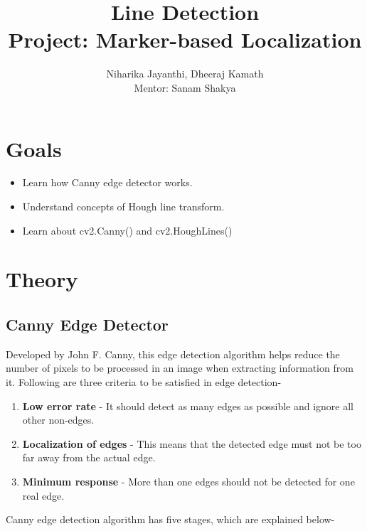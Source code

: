 \documentclass[]{article}
\date{}
\providecommand{\tightlist}{%
  \setlength{\itemsep}{0pt}\setlength{\parskip}{0pt}}
\begin{document}
	\title{\huge\textbf{Line Detection}\LARGE \\Project: Marker-based Localization}
	\author{Niharika Jayanthi, Dheeraj Kamath \\Mentor: Sanam Shakya}
	\maketitle
	\pagebreak
\section{Goals}\label{goals}

\begin{itemize}
\tightlist
\item
  Learn how Canny edge detector works.
\item
  Understand concepts of Hough line transform.
\item
  Learn about cv2.Canny() and cv2.HoughLines()
\end{itemize}

\section{Theory}\label{theory}

\subsection{Canny Edge Detector}\label{canny-edge-detector}

Developed by John F. Canny, this edge detection algorithm helps reduce
the number of pixels to be processed in an image when extracting
information from it. Following are three criteria to be satisfied in
edge detection-

\begin{enumerate}
\def\labelenumi{\arabic{enumi}.}
\tightlist
\item
  \textbf{Low error rate} - It should detect as many edges as possible
  and ignore all other non-edges.
\item
  \textbf{Localization of edges} - This means that the detected edge
  must not be too far away from the actual edge.
\item
  \textbf{Minimum response} - More than one edges should not be detected
  for one real edge.
\end{enumerate}

Canny edge detection algorithm has five stages, which are explained
below-
\end{document}
